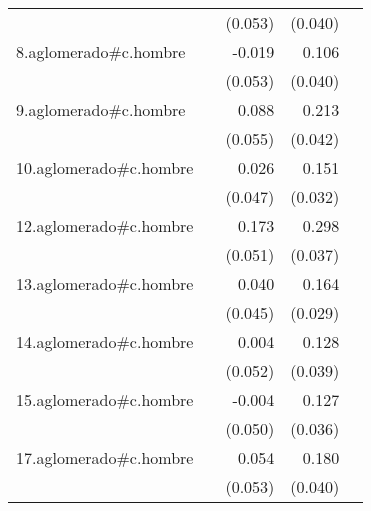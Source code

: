 {\begin{longtable}{l*{4}{D{.}{.}{-1}}}
            &                     &     (0.053)         &     (0.040)         &                     \\
\addlinespace
8.aglomerado#c.hombre&                     &      -0.019         &       0.106\sym{**} &                     \\
            &                     &     (0.053)         &     (0.040)         &                     \\
\addlinespace
9.aglomerado#c.hombre&                     &       0.088         &       0.213\sym{***}&                     \\
            &                     &     (0.055)         &     (0.042)         &                     \\
\addlinespace
10.aglomerado#c.hombre&                     &       0.026         &       0.151\sym{***}&                     \\
            &                     &     (0.047)         &     (0.032)         &                     \\
\addlinespace
12.aglomerado#c.hombre&                     &       0.173\sym{***}&       0.298\sym{***}&                     \\
            &                     &     (0.051)         &     (0.037)         &                     \\
\addlinespace
13.aglomerado#c.hombre&                     &       0.040         &       0.164\sym{***}&                     \\
            &                     &     (0.045)         &     (0.029)         &                     \\
\addlinespace
14.aglomerado#c.hombre&                     &       0.004         &       0.128\sym{**} &                     \\
            &                     &     (0.052)         &     (0.039)         &                     \\
\addlinespace
15.aglomerado#c.hombre&                     &      -0.004         &       0.127\sym{***}&                     \\
            &                     &     (0.050)         &     (0.036)         &                     \\
\addlinespace
17.aglomerado#c.hombre&                     &       0.054         &       0.180\sym{***}&                     \\
            &                     &     (0.053)         &     (0.040)         &                     \\

\end{longtable}}
